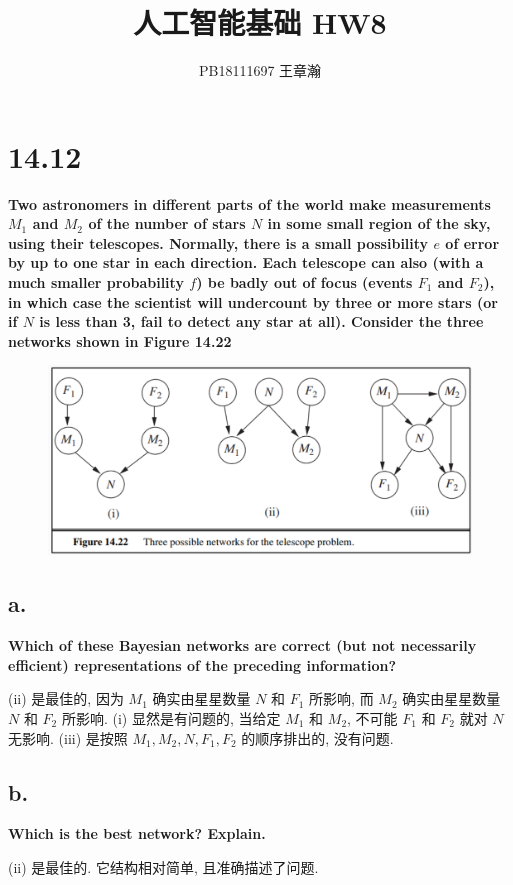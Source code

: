 \documentclass[UTF8]{article}
\title{人工智能基础 HW8}
\author{PB18111697 王章瀚}
\newcommand{\jumpLine} {\hspace*{\fill} \par}
\begin{document}
\maketitle
\section*{14.12}
\noindent \textbf{Two astronomers in different parts of the world make measurements $M_1$ and $M_2$ of the number of stars $N$ in some small region of the sky, using their telescopes. Normally, there is a small possibility $e$ of error by up to one star in each direction. Each telescope can also (with a much smaller probability $f$) be badly out of focus (events $F_1$ and $F_2$), in which case the scientist will undercount by three or more stars (or if $N$ is less than 3, fail to detect any star at all). Consider the three networks shown in Figure 14.22}

\begin{figure}[H]
	\centering
	\includegraphics[width=\linewidth*2/3]{image/14.22.png}
\end{figure}\par

\subsection*{a.}
\noindent \textbf{Which of these Bayesian networks are correct (but not necessarily efficient) representations of the preceding information?} \\\jumpLine\noindent
(ii) 是最佳的, 因为 $M_1$ 确实由星星数量 $N$ 和 $F_1$ 所影响, 而 $M_2$ 确实由星星数量 $N$ 和 $F_2$ 所影响. (i) 显然是有问题的, 当给定 $M_1$ 和 $M_2$, 不可能 $F_1$ 和 $F_2$ 就对 $N$ 无影响. (iii) 是按照 $M_1, M_2, N, F_1, F_2$ 的顺序排出的, 没有问题.

\subsection*{b.}
\noindent \textbf{Which is the best network? Explain.} \\\jumpLine\noindent
(ii) 是最佳的. 它结构相对简单, 且准确描述了问题.
\end{document}
